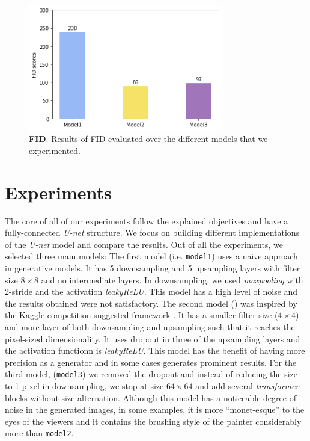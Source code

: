 \documentclass[10pt,twocolumn,letterpaper]{article}
\begin{document}
\begin{figure}
	\includegraphics[width=23em]{fid.png}
	\caption{\textbf{FID}. Results of FID evaluated over the different models that we experimented.}
	\label{figure:fid}
\end{figure}

\section{Experiments}
The core of all of our experiments follow the explained objectives and have a fully-connected \textit{U-net} structure. We focus on building different implementations of the \textit{U-net} model and compare the results. Out of all the experiments, we selected three main models: The first model (i.e. \texttt{model1}) uses a naive approach in generative models. It has 5 downsampling and 5 upsampling layers with filter size $8 \times 8$ and no intermediate layers. In downsampling, we used \textit{maxpooling} with 2-stride and the activation \textit{leakyReLU}. This model has a high level of noise and the results obtained were not satisfactory. The second model () was inspired by the Kaggle competition suggested framework \cite{kaggle}. It has a smaller filter size ($4 \times 4$) and more layer of both downsampling and upsampling such that it reaches the pixel-sized dimensionality. It uses dropout in three of the upsampling layers and the activation functionn is \textit{leakyReLU}. This model has the benefit of having more precision as a generator and in some cases generates prominent results. For the third model, (\texttt{model3}) we removed the dropout and instead of reducing the size to 1 pixel in downsampling, we stop at size $64 \times 64$ and add several \textit{transformer} blocks without size alternation. Although this model has a noticeable degree of noise in the generated images, in some examples, it is more “monet-esque” to the eyes of the viewers and it contains the brushing style of the painter considerably more than \texttt{model2}.
\end{document}
